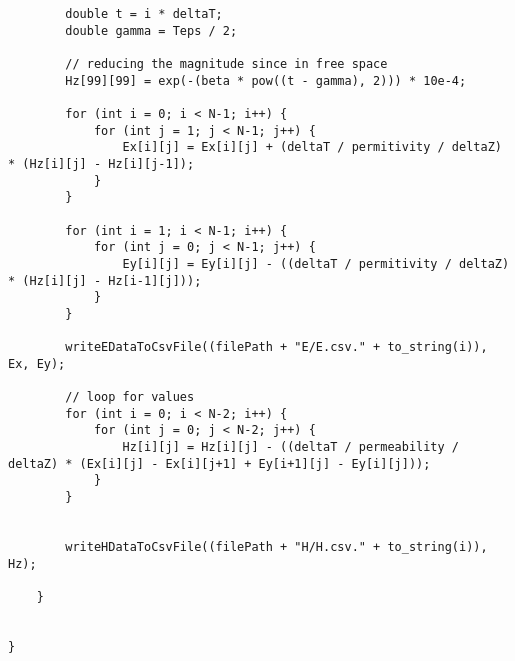 \begin{verbatim}
		double t = i * deltaT;
		double gamma = Teps / 2;
		
		// reducing the magnitude since in free space
		Hz[99][99] = exp(-(beta * pow((t - gamma), 2))) * 10e-4;
		
		for (int i = 0; i < N-1; i++) {
			for (int j = 1; j < N-1; j++) {
				Ex[i][j] = Ex[i][j] + (deltaT / permitivity / deltaZ) * (Hz[i][j] - Hz[i][j-1]);
			}
		}
		
		for (int i = 1; i < N-1; i++) {
			for (int j = 0; j < N-1; j++) {
				Ey[i][j] = Ey[i][j] - ((deltaT / permitivity / deltaZ) * (Hz[i][j] - Hz[i-1][j]));
			}
		}
		
		writeEDataToCsvFile((filePath + "E/E.csv." + to_string(i)), Ex, Ey);
		
		// loop for values
		for (int i = 0; i < N-2; i++) {
			for (int j = 0; j < N-2; j++) {
				Hz[i][j] = Hz[i][j] - ((deltaT / permeability / deltaZ) * (Ex[i][j] - Ex[i][j+1] + Ey[i+1][j] - Ey[i][j]));
			}
		}
		
		
		writeHDataToCsvFile((filePath + "H/H.csv." + to_string(i)), Hz);
		
	}
	
	
}
\end{verbatim}


